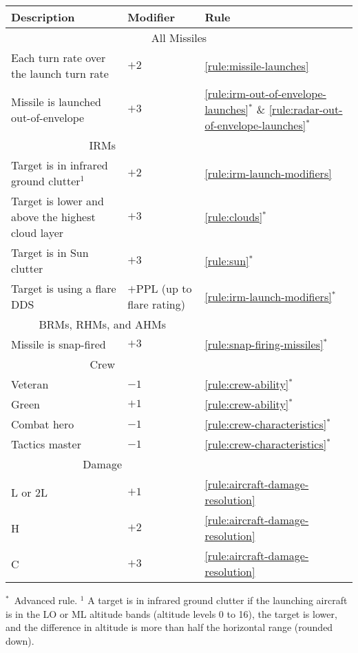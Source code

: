 {\begin{twocolumntablefloat}
\begin{twocolumntable}
\begin{tabularx}{0.9\linewidth}{Xll}
\toprule
Description&Modifier&Rule\\
\midrule
\multicolumn{3}{c}{All Missiles}\\
\midrule
Each turn rate over the launch turn rate&$+2$&\ref{rule:missile-launches}\\
Missile is launched out-of-envelope&$+3$&\ref{rule:irm-out-of-envelope-launches}$^*$ \& \ref{rule:radar-out-of-envelope-launches}$^*$\\
\midrule
\multicolumn{2}{c}{IRMs}\\
\midrule
Target is in infrared ground clutter$^1$&$+2$&\ref{rule:irm-launch-modifiers}\\
Target is lower and above the highest cloud layer&$+3$&\ref{rule:clouds}$^*$
\\
Target is in Sun clutter&$+3$&\ref{rule:sun}$^*$\\
Target is using a flare DDS&$+$PPL (up to flare rating)&\ref{rule:irm-launch-modifiers}$^*$\\
\midrule
\multicolumn{2}{c}{BRMs, RHMs, and AHMs}\\
\midrule
Missile is snap-fired&$+3$&\ref{rule:snap-firing-missiles}$^*$\\
\midrule
\multicolumn{2}{c}{Crew}\\
\midrule
Veteran&$-1$&\ref{rule:crew-ability}$^*$\\
Green&$+1$&\ref{rule:crew-ability}$^*$\\
Combat hero&$-1$&\ref{rule:crew-characteristics}$^*$\\
Tactics master&$-1$&\ref{rule:crew-characteristics}$^*$\\
\midrule
\multicolumn{2}{c}{Damage}\\
\midrule
L or 2L&$+1$&\ref{rule:aircraft-damage-resolution}\\
H&$+2$&\ref{rule:aircraft-damage-resolution}\\
C&$+3$&\ref{rule:aircraft-damage-resolution}\\
\bottomrule
\end{tabularx}
\begin{tablenote}{0.9\linewidth}
$^*$~Advanced rule. $^1$ A target is in infrared ground clutter if the launching aircraft is in the LO or ML altitude bands (altitude levels 0 to 16), the target is lower, and the difference in altitude is more than half the horizontal range (rounded down).
\end{tablenote}
\end{twocolumntable}
\end{twocolumntablefloat}
}

